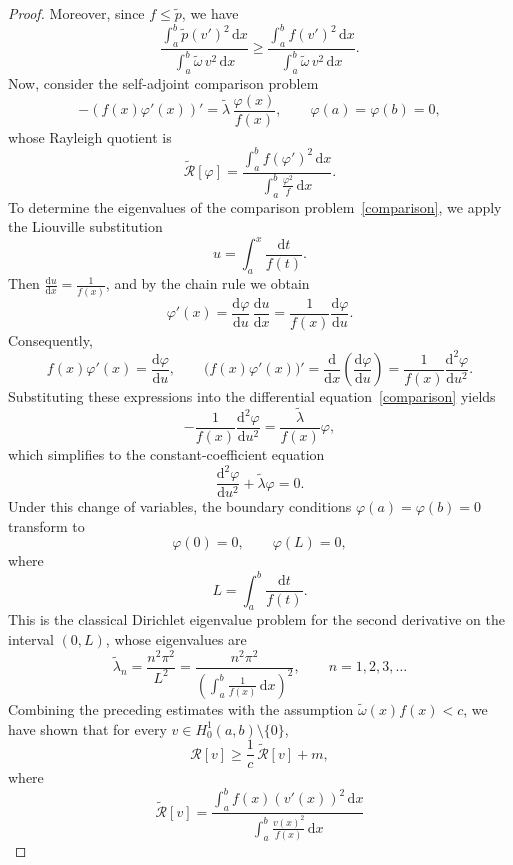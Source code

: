 \documentclass[11pt, reqno]{amsart}
\numberwithin{equation}{section}  %
\theoremstyle{plain}
\theoremstyle{definition}
\theoremstyle{remark}
\begin{document}
\begin{proof}
Moreover, since $f \leq \tilde{p}$, we have
\[
\frac{\displaystyle\int_a^b \tilde{p}(v')^2\,\mathrm{d}x}{\displaystyle\int_a^b \tilde{\omega}\,v^2\,\mathrm{d}x} \geq \frac{\displaystyle\int_a^b f(v')^2\,\mathrm{d}x}{\displaystyle\int_a^b \tilde{\omega}\,v^2\,\mathrm{d}x}.
\]
Now, consider the self-adjoint comparison problem
\begin{equation}\label{comparison}
-(f(x)\varphi'(x))' = \tilde{\lambda}\,\frac{\varphi(x)}{f(x)}, \qquad \varphi(a) = \varphi(b) = 0,
\end{equation}
whose Rayleigh quotient is
\[
\tilde{\mathcal{R}}[\varphi] = \frac{\displaystyle\int_a^b f(\varphi')^2\,\mathrm{d}x}{\displaystyle\int_a^b \frac{\varphi^2}{f}\,\mathrm{d}x}.
\]
To determine the eigenvalues of the comparison problem~\eqref{comparison}, we apply the Liouville substitution
\[
u = \int_a^x \frac{\mathrm{d}t}{f(t)}.
\]
Then $\frac{\mathrm{d}u}{\mathrm{d}x} = \frac{1}{f(x)}$, and by the chain rule we obtain
\[
\varphi'(x)
= \frac{\mathrm{d}\varphi}{\mathrm{d}u}\,\frac{\mathrm{d}u}{\mathrm{d}x}
= \frac{1}{f(x)}\frac{\mathrm{d}\varphi}{\mathrm{d}u}.
\]
Consequently,
\[
f(x)\varphi'(x) = \frac{\mathrm{d}\varphi}{\mathrm{d}u},
\qquad
\bigl(f(x)\varphi'(x)\bigr)'
= \frac{\mathrm{d}}{\mathrm{d}x}\left(\frac{\mathrm{d}\varphi}{\mathrm{d}u}\right)
= \frac{1}{f(x)}\frac{\mathrm{d}^2\varphi}{\mathrm{d}u^2}.
\]
Substituting these expressions into the differential equation~\eqref{comparison} yields
\[
-\frac{1}{f(x)}\frac{\mathrm{d}^2\varphi}{\mathrm{d}u^2}
= \frac{\tilde{\lambda}}{f(x)}\varphi,
\]
which simplifies to the constant-coefficient equation
\[
\frac{\mathrm{d}^2\varphi}{\mathrm{d}u^2} + \tilde{\lambda}\varphi = 0.
\]
Under this change of variables, the boundary conditions $\varphi(a)=\varphi(b)=0$ transform to
\[
\varphi(0)=0,
\qquad
\varphi(L)=0,
\]
where
\[
L=\int_a^b \frac{\mathrm{d}t}{f(t)}.
\]
This is the classical Dirichlet eigenvalue problem for the second derivative on the interval $(0,L)$, whose eigenvalues are
\[
\tilde{\lambda}_n = \frac{n^2\pi^2}{L^2}
= \frac{n^2\pi^2}{\left(\displaystyle\int_a^b \frac{1}{f(x)}\,\mathrm{d}x\right)^2},
\qquad n=1,2,3,\ldots
\]
Combining the preceding estimates with the assumption $\tilde{\omega}(x)f(x)<c$, we have shown that for every
$v\in H_0^1(a,b)\setminus\{0\}$,
\[
\mathcal{R}[v]
\ge \frac{1}{c}\,\tilde{\mathcal{R}}[v] + m,
\]
where
\[
\tilde{\mathcal{R}}[v]
= \frac{\displaystyle\int_a^b f(x)(v'(x))^2\,\mathrm{d}x}
{\displaystyle\int_a^b \frac{v(x)^2}{f(x)}\,\mathrm{d}x}
\]
\end{proof}
\end{document}
